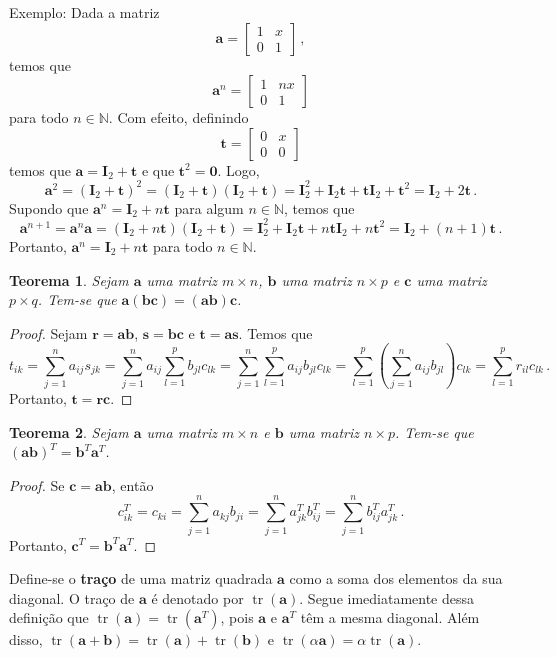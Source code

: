 \documentclass[12pt,a4paper]{report}
\newcommand{\tb}{\textbf}
\newcommand{\mb}{\mathbf}
\newcommand{\dpar}[1]{\left(#1\right)}
\newcommand{\N}{\mathbb{N}}
\newtheorem{thm}{Teorema}[chapter]
\DeclareMathOperator{\tr}{tr}
\begin{document}
Exemplo: Dada a matriz
$$\mb a=\begin{bmatrix}
  1&x\\
  0&1
\end{bmatrix}\,,$$
temos que
$$\mb a^n=\begin{bmatrix}
  1&nx\\
  0&1
\end{bmatrix}$$
para todo $n\in\N$. Com efeito, definindo
$$\mb t=\begin{bmatrix}
  0&x\\
  0&0
\end{bmatrix}$$
temos que $\mb a=\mb I_2+\mb t$ e que $\mb t^2=\mb 0$. Logo,
$$\mb a^2=(\mb I_2+\mb t)^2=(\mb I_2+\mb t)(\mb I_2+\mb t)=\mb I_2^2+\mb I_2\mb t+\mb t\mb I_2+\mb t^2=\mb I_2+2\mb t\,.$$
Supondo que $\mb a^n=\mb I_2+n\mb t$ para algum $n\in\N$, temos que
$$\mb a^{n+1}=\mb a^n\mb a=(\mb I_2+n\mb t)(\mb I_2+\mb t)=\mb I_2^2+\mb I_2\mb t+n\mb t\mb I_2+n\mb t^2=\mb I_2+(n+1)\mb t\,.$$
Portanto, $\mb a^n=\mb I_2+n\mb t$ para todo $n\in\N$.

\begin{thm}
  Sejam $\mb a$ uma matriz $m\times n$, $\mb b$ uma matriz $n\times p$ e $\mb c$ uma matriz $p\times q$. Tem-se que $\mb a(\mb {bc})=(\mb{ab})\mb c$.
\end{thm}
\begin{proof}
  Sejam $\mb r=\mb{ab}$, $\mb s=\mb {bc}$ e $\mb t=\mb {as}$. Temos que
  $$t_{ik}=\sum_{j=1}^na_{ij}s_{jk}=\sum_{j=1}^na_{ij}\sum_{l=1}^pb_{jl}c_{lk}=\sum_{j=1}^n\sum_{l=1}^pa_{ij}b_{jl}c_{lk}=\sum_{l=1}^p\dpar{\sum_{j=1}^na_{ij}b_{jl}}c_{lk}=\sum_{l=1}^pr_{il}c_{lk}\,.$$
  Portanto, $\mb t=\mb {rc}$.
\end{proof}

\begin{thm}
  Sejam $\mb a$ uma matriz $m\times n$ e $\mb b$ uma matriz $n\times p$. Tem-se que $(\mb a\mb b)^T=\mb b^T\mb a^T$.
\end{thm}
\begin{proof}
  Se $\mb c=\mb {ab}$, então
  $$c^T_{ik}=c_{ki}=\sum_{j=1}^na_{kj}b_{ji}=\sum_{j=1}^na_{jk}^Tb_{ij}^T=\sum_{j=1}^nb_{ij}^Ta_{jk}^T\,.$$
  Portanto, $\mb c^T=\mb b^T\mb a^T$.
\end{proof}

Define-se o \tb{traço} de uma matriz quadrada $\mb a$ como a soma dos elementos da sua diagonal. O traço de $\mb a$ é denotado por $\tr(\mb a)$. Segue imediatamente dessa definição que $\tr(\mb a)=\tr(\mb a^T)$, pois $\mb a$ e $\mb a^T$ têm a mesma diagonal. Além disso, $\tr(\mb a+\mb b)=\tr(\mb a)+\tr(\mb b)$ e $\tr(\alpha\mb a)=\alpha\tr(\mb a)$.
\end{document}
